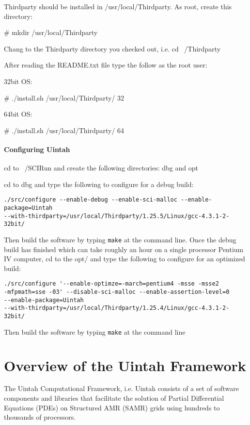 \documentclass[12pt]{report}
\begin{document}
Thirdparty should be installed in /usr/local/Thirdparty.  As root,
create this directory:

\# mkdir /usr/local/Thirdparty

Chang to the Thirdparty directory you checked out, i.e. cd ~/Thirdparty

After reading the README.txt file type the follow as the root user:

32bit OS:

\# ./install.sh /usr/local/Thirdparty/ 32

64bit OS:

\# ./install.sh /usr/local/Thirdparty/ 64


\subsubsection{Configuring Uintah}

cd to ~/SCIRun and create the following directories: dbg and opt

cd to dbg and type the following to configure for a debug build:

\begin{verbatim}
./src/configure --enable-debug --enable-sci-malloc --enable-package=Uintah 
--with-thirdparty=/usr/local/Thirdparty/1.25.5/Linux/gcc-4.3.1-2-32bit/
\end{verbatim}

Then build the software by typing \texttt{make} at the command
line. Once the debug build has finished which can take roughly an hour
on a single processor Pentium IV computer, cd to the opt/ and type the
following to configure for an optimized build:

\begin{verbatim}
./src/configure '--enable-optimze=-march=pentium4 -msse -msse2 
-mfpmath=sse -03' --disable-sci-malloc --enable-assertion-level=0 
--enable-package=Uintah 
--with-thirdparty=/usr/local/Thirdparty/1.25.4/Linux/gcc-4.3.1-2-32bit/
\end{verbatim}

Then build the software by typing \texttt{make} at the command line


\chapter{Overview of the Uintah Framework}

The Uintah Computational Framework, i.e. Uintah consists of a set of
software components and libraries that facilitate the solution of
Partial Differential Equations (PDEs) on Structured AMR (SAMR) grids
using hundreds to thousands of processors.
\end{document}
